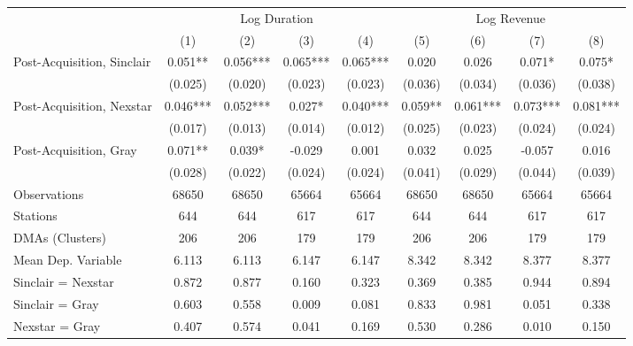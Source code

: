 {
\def\sym#1{\ifmmode^{#1}\else\(^{#1}\)\fi}
\begin{tabular}{l*{8}{c}}
\toprule
                &\multicolumn{4}{c}{Log Duration}                   &\multicolumn{4}{c}{Log Revenue}                    \\\cmidrule(lr){2-5}\cmidrule(lr){6-9}
                &\multicolumn{1}{c}{(1)}   &\multicolumn{1}{c}{(2)}   &\multicolumn{1}{c}{(3)}   &\multicolumn{1}{c}{(4)}   &\multicolumn{1}{c}{(5)}   &\multicolumn{1}{c}{(6)}   &\multicolumn{1}{c}{(7)}   &\multicolumn{1}{c}{(8)}   \\
\midrule
Post-Acquisition, Sinclair&    0.051** &    0.056***&    0.065***&    0.065***&    0.020   &    0.026   &    0.071*  &    0.075*  \\
                &  (0.025)   &  (0.020)   &  (0.023)   &  (0.023)   &  (0.036)   &  (0.034)   &  (0.036)   &  (0.038)   \\
Post-Acquisition, Nexstar&    0.046***&    0.052***&    0.027*  &    0.040***&    0.059** &    0.061***&    0.073***&    0.081***\\
                &  (0.017)   &  (0.013)   &  (0.014)   &  (0.012)   &  (0.025)   &  (0.023)   &  (0.024)   &  (0.024)   \\
Post-Acquisition, Gray&    0.071** &    0.039*  &   -0.029   &    0.001   &    0.032   &    0.025   &   -0.057   &    0.016   \\
                &  (0.028)   &  (0.022)   &  (0.024)   &  (0.024)   &  (0.041)   &  (0.029)   &  (0.044)   &  (0.039)   \\
\midrule
Observations    &    68650   &    68650   &    65664   &    65664   &    68650   &    68650   &    65664   &    65664   \\
Stations        &      644   &      644   &      617   &      617   &      644   &      644   &      617   &      617   \\
DMAs (Clusters) &      206   &      206   &      179   &      179   &      206   &      206   &      179   &      179   \\
Mean Dep. Variable&    6.113   &    6.113   &    6.147   &    6.147   &    8.342   &    8.342   &    8.377   &    8.377   \\
\midrule Sinclair = Nexstar&    0.872   &    0.877   &    0.160   &    0.323   &    0.369   &    0.385   &    0.944   &    0.894   \\
Sinclair = Gray &    0.603   &    0.558   &    0.009   &    0.081   &    0.833   &    0.981   &    0.051   &    0.338   \\
Nexstar = Gray  &    0.407   &    0.574   &    0.041   &    0.169   &    0.530   &    0.286   &    0.010   &    0.150   \\
\bottomrule
\end{tabular}
}
